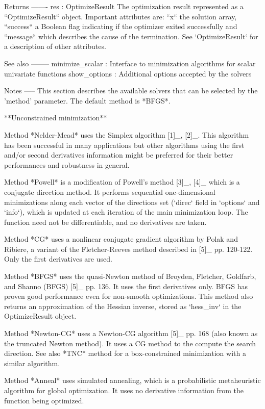 \begin{DoxyVerb}
Returns
-------
res : OptimizeResult
    The optimization result represented as a ``OptimizeResult`` object.
    Important attributes are: ``x`` the solution array, ``success`` a
    Boolean flag indicating if the optimizer exited successfully and
    ``message`` which describes the cause of the termination. See
    `OptimizeResult` for a description of other attributes.


See also
--------
minimize_scalar : Interface to minimization algorithms for scalar
    univariate functions
show_options : Additional options accepted by the solvers

Notes
-----
This section describes the available solvers that can be selected by the
'method' parameter. The default method is *BFGS*.

**Unconstrained minimization**

Method *Nelder-Mead* uses the Simplex algorithm [1]_, [2]_. This
algorithm has been successful in many applications but other algorithms
using the first and/or second derivatives information might be preferred
for their better performances and robustness in general.

Method *Powell* is a modification of Powell's method [3]_, [4]_ which
is a conjugate direction method. It performs sequential one-dimensional
minimizations along each vector of the directions set (`direc` field in
`options` and `info`), which is updated at each iteration of the main
minimization loop. The function need not be differentiable, and no
derivatives are taken.

Method *CG* uses a nonlinear conjugate gradient algorithm by Polak and
Ribiere, a variant of the Fletcher-Reeves method described in [5]_ pp.
120-122. Only the first derivatives are used.

Method *BFGS* uses the quasi-Newton method of Broyden, Fletcher,
Goldfarb, and Shanno (BFGS) [5]_ pp. 136. It uses the first derivatives
only. BFGS has proven good performance even for non-smooth
optimizations. This method also returns an approximation of the Hessian
inverse, stored as `hess_inv` in the OptimizeResult object.

Method *Newton-CG* uses a Newton-CG algorithm [5]_ pp. 168 (also known
as the truncated Newton method). It uses a CG method to the compute the
search direction. See also *TNC* method for a box-constrained
minimization with a similar algorithm.

Method *Anneal* uses simulated annealing, which is a probabilistic
metaheuristic algorithm for global optimization. It uses no derivative
information from the function being optimized.


\end{DoxyVerb}
